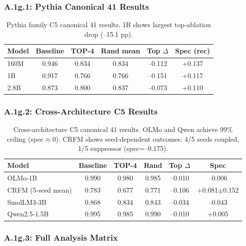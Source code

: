 \documentclass[10pt]{article} %
\begin{document}
\subsubsection*{A.1g.1: Pythia Canonical 41 Results}

\begin{table}[H]
\centering
\small
\begin{tabular}{|l|c|c|c|c|c|}
\hline
\textbf{Model} & \textbf{Baseline} & \textbf{TOP-4} & \textbf{Rand mean} & \textbf{Top $\Delta$} & \textbf{Spec (rec)} \\
\hline
160M & 0.946 & 0.834 & 0.834 & --0.112 & +0.137 \\
1B & 0.917 & 0.766 & 0.766 & --0.151 & +0.117 \\
2.8B & 0.873 & 0.800 & 0.837 & --0.073 & +0.110 \\
\hline
\end{tabular}
\caption{Pythia family C5 canonical 41 results. 1B shows largest top-ablation drop (--15.1 pp).}
\label{tab:a1g1_pythia_c5}
\end{table}

\subsubsection*{A.1g.2: Cross-Architecture C5 Results}

\begin{table}[H]
\centering
\small
\begin{tabular}{|l|c|c|c|c|c|}
\hline
\textbf{Model} & \textbf{Baseline} & \textbf{TOP-4} & \textbf{Rand} & \textbf{Top $\Delta$} & \textbf{Spec} \\
\hline
OLMo-1B & 0.990 & 0.980 & 0.985 & --0.010 & --0.006 \\
CRFM (5-seed mean) & 0.783 & 0.677 & 0.771 & --0.106 & +0.081$\pm$0.152 \\
SmolLM3-3B & 0.868 & 0.834 & 0.843 & --0.034 & --0.043 \\
Qwen2.5-1.5B & 0.995 & 0.985 & 0.990 & --0.010 & +0.005 \\
\hline
\end{tabular}
\caption{Cross-architecture C5 canonical 41 results. OLMo and Qwen achieve 99\% ceiling (spec$\approx$0). CRFM shows seed-dependent outcomes: 4/5 seeds coupled, 1/5 suppressor (spec=--0.175).}
\label{tab:c5_crossarch}
\end{table}

\subsubsection*{A.1g.3: Full Analysis Matrix}
\end{document}
